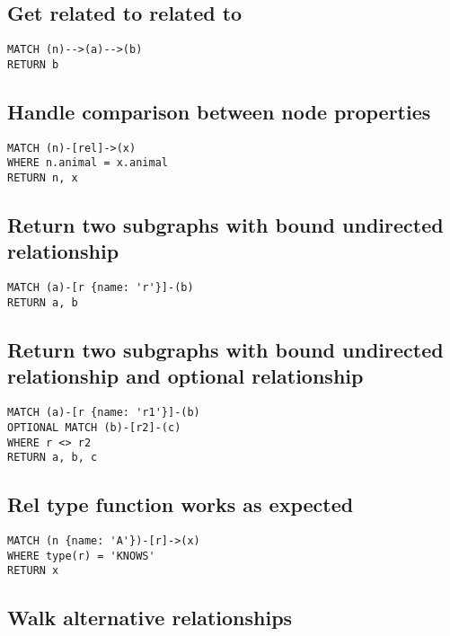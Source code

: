 \subsection{Get related to related to}

\begin{lstlisting}
MATCH (n)-->(a)-->(b)
RETURN b
\end{lstlisting}

\subsection{Handle comparison between node properties}

\begin{lstlisting}
MATCH (n)-[rel]->(x)
WHERE n.animal = x.animal
RETURN n, x
\end{lstlisting}

\subsection{Return two subgraphs with bound undirected relationship}

\begin{lstlisting}
MATCH (a)-[r {name: 'r'}]-(b)
RETURN a, b
\end{lstlisting}

\subsection{Return two subgraphs with bound undirected relationship and optional relationship}

\begin{lstlisting}
MATCH (a)-[r {name: 'r1'}]-(b)
OPTIONAL MATCH (b)-[r2]-(c)
WHERE r <> r2
RETURN a, b, c
\end{lstlisting}

\subsection{Rel type function works as expected}

\begin{lstlisting}
MATCH (n {name: 'A'})-[r]->(x)
WHERE type(r) = 'KNOWS'
RETURN x
\end{lstlisting}

\subsection{Walk alternative relationships}

